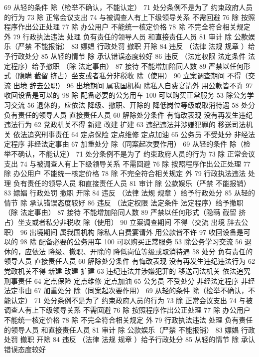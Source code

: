 \documentclass[11pt]{ctexart}
\begin{document}
69 从轻的条件
除（检举不确认，不能认定）
71 处分条例不是为了
约束政府人员的行为
73 除 正常会议支出
74 与被调查人有上下级领导关系 不需回避
76 除 按照程序作出公正处理
77 除 办公用户
不能统一核定价格
78 除 不完全符合相关规定 外
79 行政执法违法 处理
负有责任的领导人员
和直接责任人员
81 审计
除 公款娱乐（严禁 不能报销）
83 嫖娼 行政处罚
撤职 开除
84 违反 （法律 法规 规章 ）给予行政处分
85 从轻的情节
除 承认错误态度较好
86 违反 （法定权限 法定条件 法定程序）给予撤职
（除 法定事由）
87 接待 不能增加陪同人数
89 严禁以任何形式（隐瞒 截留 挤占）坐支或者私分非税收
除（使用）
90 立案调查期间 不得（交流 出境 辞去公职）
96 出境期间 属我国机构 除私人自费宴请外 用公款皆不许
97 收回设备是可以的
98 除 配备必要的公务用车
100 可以购买正常服务
53 除公务学习交流
56 退休的，应依法
降级、撤职、开除的 降低岗位等级或取消待遇
58 处分
负有责任的领导人员
直接责任人员
60 解除处分条件
有悔改表现
没有再发生违纪违法行为
62 党政机关不得
新建 改建 扩建
63 违纪违法并涉嫌犯罪的
移送司法机关
依法追究刑事责任
64 定点保险 定点维修 定点加油
65 公务员 不受处分
非经法定程序
非经法定事由
67 加重处分
除（同案起次要作用）
69 从轻的条件
除（检举不确认，不能认定）
71 处分条例不是为了
约束政府人员的行为
73 除 正常会议支出
74 与被调查人有上下级领导关系 不需回避
76 除 按照程序作出公正处理
77 除 办公用户
不能统一核定价格
78 除 不完全符合相关规定 外
79 行政执法违法 处理
负有责任的领导人员
和直接责任人员
81 审计
除 公款娱乐（严禁 不能报销）
83 嫖娼 行政处罚
撤职 开除
84 违反 （法律 法规 规章 ）给予行政处分
85 从轻的情节
除 承认错误态度较好
86 违反 （法定权限 法定条件 法定程序）给予撤职
（除 法定事由）
87 接待 不能增加陪同人数
89 严禁以任何形式（隐瞒 截留 挤占）坐支或者私分非税收
除（使用）
90 立案调查期间 不得（交流 出境 辞去公职）
96 出境期间 属我国机构 除私人自费宴请外 用公款皆不许
97 收回设备是可以的
98 除 配备必要的公务用车
100 可以购买正常服务
53 除公务学习交流
56 退休的，应依法
降级、撤职、开除的 降低岗位等级或取消待遇
58 处分
负有责任的领导人员
直接责任人员
60 解除处分条件
有悔改表现
没有再发生违纪违法行为
62 党政机关不得
新建 改建 扩建
63 违纪违法并涉嫌犯罪的
移送司法机关
依法追究刑事责任
64 定点保险 定点维修 定点加油
65 公务员 不受处分
非经法定程序
非经法定事由
67 加重处分
除（同案起次要作用）
69 从轻的条件
除（检举不确认，不能认定）
71 处分条例不是为了
约束政府人员的行为
73 除 正常会议支出
74 与被调查人有上下级领导关系 不需回避
76 除 按照程序作出公正处理
77 除 办公用户
不能统一核定价格
78 除 不完全符合相关规定 外
79 行政执法违法 处理
负有责任的领导人员
和直接责任人员
81 审计
除 公款娱乐（严禁 不能报销）
83 嫖娼 行政处罚
撤职 开除
84 违反 （法律 法规 规章 ）给予行政处分
85 从轻的情节
除 承认错误态度较好
\end{document}
